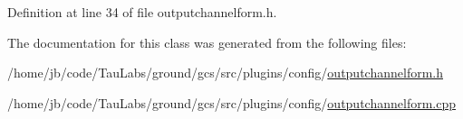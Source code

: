 \-Definition at line 34 of file outputchannelform.\-h.



\-The documentation for this class was generated from the following files\-:\begin{DoxyCompactItemize}
\item 
/home/jb/code/\-Tau\-Labs/ground/gcs/src/plugins/config/\hyperlink{outputchannelform_8h}{outputchannelform.\-h}\item 
/home/jb/code/\-Tau\-Labs/ground/gcs/src/plugins/config/\hyperlink{outputchannelform_8cpp}{outputchannelform.\-cpp}\end{DoxyCompactItemize}
